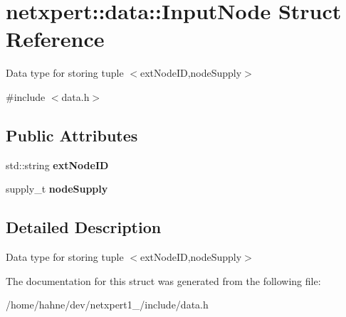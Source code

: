 \hypertarget{structnetxpert_1_1data_1_1InputNode}{}\section{netxpert\+:\+:data\+:\+:Input\+Node Struct Reference}
\label{structnetxpert_1_1data_1_1InputNode}


Data type for storing tuple $<$ext\+Node\+ID,node\+Supply$>$  




{\ttfamily \#include $<$data.\+h$>$}

\subsection*{Public Attributes}
\begin{DoxyCompactItemize}
\item 
std\+::string {\bfseries ext\+Node\+ID}\hypertarget{structnetxpert_1_1data_1_1InputNode_ac64b67ca4891f9ec38e0696516b7104a}{}\label{structnetxpert_1_1data_1_1InputNode_ac64b67ca4891f9ec38e0696516b7104a}

\item 
supply\+\_\+t {\bfseries node\+Supply}\hypertarget{structnetxpert_1_1data_1_1InputNode_adc1ecc439c628a3bee4bdc99aad38a64}{}\label{structnetxpert_1_1data_1_1InputNode_adc1ecc439c628a3bee4bdc99aad38a64}

\end{DoxyCompactItemize}


\subsection{Detailed Description}
Data type for storing tuple $<$ext\+Node\+ID,node\+Supply$>$ 

The documentation for this struct was generated from the following file\+:\begin{DoxyCompactItemize}
\item 
/home/hahne/dev/netxpert1\+\_/include/data.\+h\end{DoxyCompactItemize}
